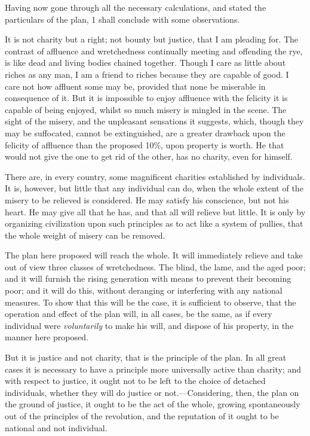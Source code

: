 Having now gone through all the necessary calculations, and stated the particulars of the plan, 1 shall conclude with some observations.

It is not charity but a right; not bounty but justice, that I am pleading for. The contrast of affluence and wretchedness continually meeting and offending the rye, is like dead and living bodies chained together. Though I care as little about riches as any man, I am a friend to riches because they are capable of good. I care not how affluent some may be, provided that none be miserable in consequence of it. But it is impossible to enjoy affluence with the felicity it is capable of being enjoyed, whilst so much misery is mingled in the scene. The sight of the misery, and the unpleasant sensations it suggests, which, though they may be suffocated, cannot be extinguished, are a greater drawback upon the felicity of affluence than the proposed 10\%, upon property is worth. He that would not give the one to get rid of the other, has no charity, even for himself.

There are, in every country, some magnificent charities established by individuals. It is, however, but little that any individual can do, when the whole extent of the misery to be relieved is considered. He may satisfy his conscience, but not his heart. He may give all that he has, and that all will relieve but little. It is only by organizing civilization upon such principles as to act like a system of pullies, that the whole weight of misery can be removed.

The plan here proposed will reach the whole. It will immediately relieve and take out of view three classes of wretchedness. The blind, the lame, and the aged poor; and it will furnish the rising generation with means to prevent their becoming poor; and it will do this, without deranging or interfering with any national measures. To show that this will be the case, it is sufficient to observe, that the operation and effect of the plan will, in all cases, be the same, as if every individual were \emph{voluntarily} to make his will, and dispose of his property, in the manner here proposed.

But it is justice and not charity, that is the principle of the plan. In all great cases it is necessary to have a principle more universally active than charity; and with respect to justice, it ought not to be left to the choice of detached individuals, whether they will do justice or not.—Considering, then, the plan on the ground of justice, it ought to be the act of the whole, growing spontaneously out of the principles of the revolution, and the reputation of it ought to be national and not individual.

